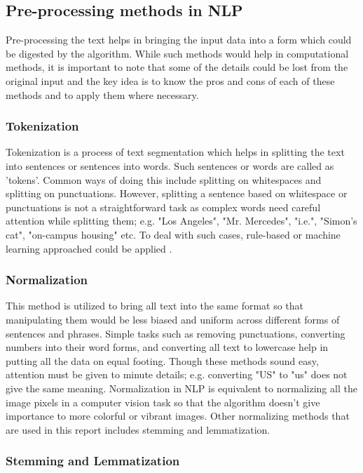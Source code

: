 	\subsection{Pre-processing methods in NLP}
	
	Pre-processing the text helps in bringing the input data into a form which could be digested by the algorithm. While such methods would help in computational methods, it is important to note that some of the details could be lost from the original input and the key idea is to know the pros and cons of each of these methods and to apply them where necessary.
	
	\subsubsection{Tokenization}
	
	Tokenization is a process of text segmentation which helps in splitting the text into sentences or sentences into words. Such sentences or words are called as 'tokens'. Common ways of doing this include splitting on whitespaces and splitting on punctuations. However, splitting a sentence based on whitespace or punctuations is not a straightforward task as complex words need careful attention while splitting them; e.g. "Los Angeles", "Mr. Mercedes", "i.e.", "Simon's cat", "on-campus housing" etc. To deal with such cases, rule-based or machine learning approached could be applied \cite{jurafsky2014speech}.
	
	\subsubsection{Normalization}
	
	This method is utilized to bring all text into the same format so that manipulating them would be less biased and uniform across different forms of sentences and phrases. Simple tasks such as removing punctuations, converting numbers into their word forms, and converting all text to lowercase help in putting all the data on equal footing. Though these methods sound easy, attention must be given to minute details; e.g. converting "US" to "us" does not give the same meaning. Normalization in NLP is equivalent to normalizing all the image pixels in a computer vision task so that the algorithm doesn't give importance to more colorful or vibrant images. Other normalizing methods that are used in this report includes stemming and lemmatization. 
	
	\subsubsection{Stemming and Lemmatization}
	
